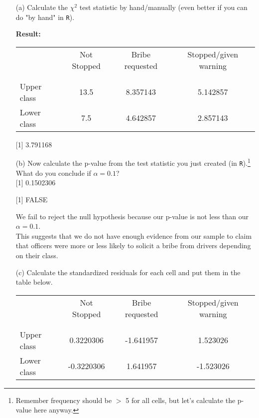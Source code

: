 \documentclass[12pt,letterpaper]{article}
\begin{document}
\begin{enumerate}
	
	\item [(a)]
	Calculate the $\chi^2$ test statistic by hand/manually (even better if you can do "by hand" in \texttt{R}).\\
	\vspace{0.2cm}
	  
\textbf{	Result:}
	\begin{table}[h!]
		\centering
		\begin{tabular}{l | c c c }
			& Not Stopped & Bribe requested & Stopped/given warning \\
			\\[-1.8ex] 
			\hline \\[-1.8ex]
			Upper class & 13.5 & 8.357143 &  5.142857 \\
			Lower class & 7.5 & 4.642857 & 2.857143 \\
			\hline
		\end{tabular}
	\end{table}

	  
[1] 3.791168

	\newpage
	\item [(b)]
	Now calculate the p-value from the test statistic you just created (in \texttt{R}).\footnote{Remember frequency should be $>$ 5 for all cells, but let's calculate the p-value here anyway.}  What do you conclude if $\alpha = 0.1$?\\
	
	
		[1] 0.1502306
		
		[1] FALSE
		
		We fail to reject the null hypothesis because our p-value is not less than our $\alpha = 0.1$.\\ This suggests that we do not have enough evidence from our sample to claim that officers were more or less likely to solicit a bribe from drivers depending on their class. 
	\newpage
	\item [(c)] Calculate the standardized residuals for each cell and put them in the table below.
	\vspace{1cm}
		 
	\begin{table}[h!]
		\centering
		\begin{tabular}{l | c c c }
			& Not Stopped & Bribe requested & Stopped/given warning \\
			\\[-1.8ex] 
			\hline \\[-1.8ex]
			Upper class & 0.3220306 & -1.641957 &  1.523026 \\
			Lower class & -0.3220306 & 1.641957 & -1.523026 \\
			\hline
		\end{tabular}
	\end{table}
	

\end{enumerate}
\end{document}
